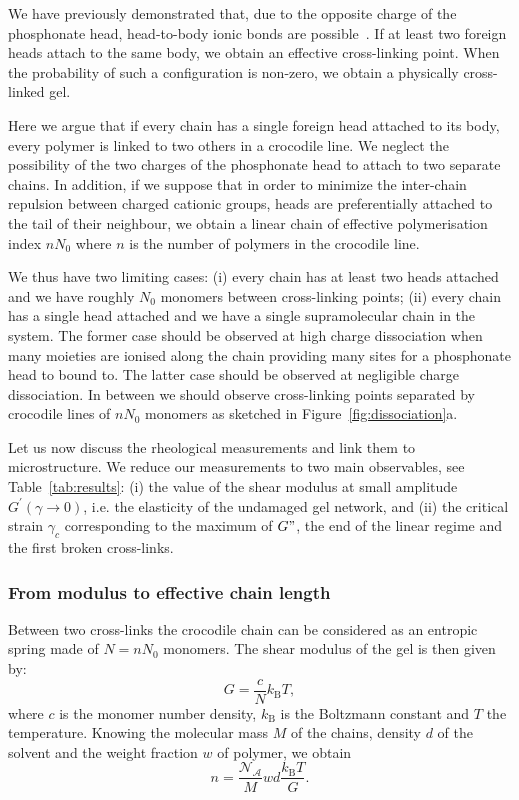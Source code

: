\documentclass[journal=jacsat,manuscript=article]{achemso}
\begin{document}
We have previously demonstrated that, due to the opposite charge of the phosphonate head, head-to-body ionic bonds are possible~\cite{Srour2014}. If at least two foreign heads attach to the same body, we obtain an effective cross-linking point. When the probability of such a configuration is non-zero, we obtain a physically cross-linked gel.

Here we argue that if every chain has a single foreign head attached to its body, every polymer is linked to two others in a crocodile line. We neglect the possibility of the two charges of the phosphonate head to attach to two separate chains. In addition, if we suppose that in order to minimize the inter-chain repulsion between charged cationic groups, heads are preferentially attached to the tail of their neighbour, we obtain a linear chain of effective polymerisation index $n N_0$ where $n$ is the number of polymers in the crocodile line.

We thus have two limiting cases: (i) every chain has at least two heads attached and we have roughly $N_0$ monomers between cross-linking points; (ii) every chain has a single head attached and we have a single supramolecular chain in the system. The former case should be observed at high charge dissociation when many moieties are ionised along the chain providing many sites for a phosphonate head to bound to. The latter case should be observed at negligible charge dissociation. In between we should observe cross-linking points separated by crocodile lines of $n N_0$ monomers as sketched in Figure~\ref{fig:dissociation}a.

Let us now discuss the rheological measurements and link them to microstructure. We reduce our measurements to two main observables, see Table~\ref{tab:results}: (i) the value of the shear modulus at small amplitude $G^\prime(\gamma\rightarrow 0)$, i.e. the elasticity of the undamaged gel network, and (ii) the critical strain $\gamma_c$ corresponding to the maximum of $G"$, the end of the linear regime and the first broken cross-links.


\subsubsection{From modulus to effective chain length}

Between two cross-links the crocodile chain can be considered as an entropic spring made of $N=n N_0$ monomers. The shear modulus of the gel is then given by\cite{Rubinstein1996}:
\begin{equation}
G = \frac{c}{N}k_\mathrm{B}T,
\label{eq:G}
\end{equation}
where $c$ is the monomer number density, $k_\mathrm{B}$ is the Boltzmann constant and $T$ the temperature. Knowing the molecular mass $M$ of the chains, density $d$ of the solvent and the weight fraction $w$ of polymer, we obtain
\begin{equation}
n = \frac{\mathcal{N_A}}{M} w d \frac{k_\mathrm{B}T}{G}.
\end{equation}
\end{document}
